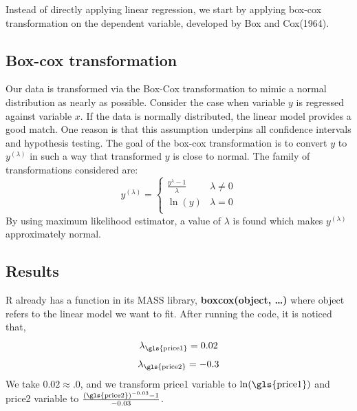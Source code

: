 \documentclass[12pt]{article}
\begin{document}
Instead of directly applying linear regression, we start by applying box-cox transformation on the dependent variable, developed by Box and Cox(1964).

\subsection{Box-cox transformation}
\label{boxcox}
Our data is transformed via the Box-Cox transformation to mimic a normal distribution as nearly as possible. Consider the case when variable $y$ is regressed against variable $x$. If the data is normally distributed, the linear model provides a good match. One reason is that this assumption underpins all confidence intervals and hypothesis testing. The goal of the box-cox transformation is to convert $y$ to $y^{(\lambda)}$ in such a way that transformed $y$ is close to normal. The family of transformations considered are:
$$  y^{(\lambda)}=\left\{\begin{array}{ll}
      \frac{y^{\lambda}-1}{\lambda} & \lambda\neq 0 \\
      \ln (y) & \lambda=0 \\
\end{array} \right.$$
By using maximum likelihood estimator, a value of $\lambda$ is found which makes $y^{(\lambda)}$ approximately normal.

\subsection{Results}
R already has a function in its MASS library, \textbf{boxcox(object, …)} where object refers to the linear model we want to fit. After running the code, it is noticed that, 
$$\lambda_{\textrm{\gls{price1}}}=0.02$$
$$\lambda_{\textrm{\gls{price2}}}=-0.3$$
We take $0.02 \approx. 0$, and we transform \gls{price1} variable to $\ln(\textrm{\gls{price1})}$ and \gls{price2} variable to $\frac{(\textrm{\gls{price2}})^{-0.03}-1}{-0.03}$.\\
\end{document}
